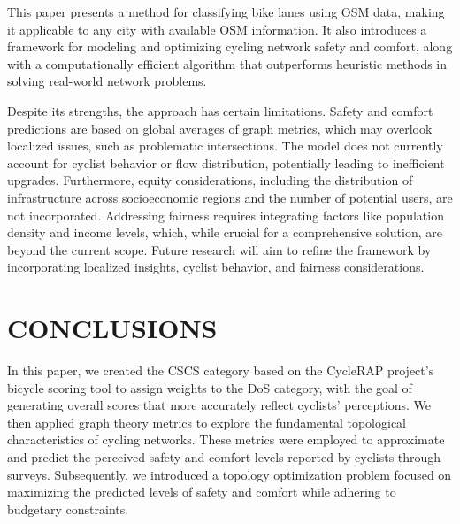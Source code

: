 \documentclass[lettersize,journal]{IEEEtran}
\begin{document}
This paper presents a method for classifying bike lanes using OSM data, making it applicable to any city with available OSM information. It also introduces a framework for modeling and optimizing cycling network safety and comfort, along with a computationally efficient algorithm that outperforms heuristic methods in solving real-world network problems.

Despite its strengths, the approach has certain limitations. Safety and comfort predictions are based on global averages of graph metrics, which may overlook localized issues, such as problematic intersections. The model does not currently account for cyclist behavior or flow distribution, potentially leading to inefficient upgrades. Furthermore, equity considerations, including the distribution of infrastructure across socioeconomic regions and the number of potential users, are not incorporated. Addressing fairness requires integrating factors like population density and income levels, which, while crucial for a comprehensive solution, are beyond the current scope. Future research will aim to refine the framework by incorporating localized insights, cyclist behavior, and fairness considerations.



\section{CONCLUSIONS}
\label{future_work}
In this paper, we created the CSCS category based on the CycleRAP project's bicycle scoring tool to assign weights to the DoS category, with the goal of generating overall scores that more accurately reflect cyclists' perceptions. We then applied graph theory metrics to explore the fundamental topological characteristics of cycling networks. These metrics were employed to approximate and predict the perceived safety and comfort levels reported by cyclists through surveys. Subsequently, we introduced a topology optimization problem focused on maximizing the predicted levels of safety and comfort while adhering to budgetary constraints.
\end{document}
